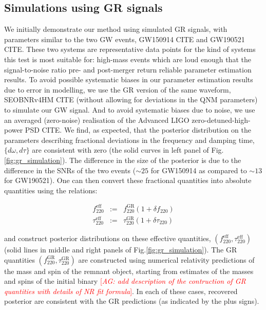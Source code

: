 \documentclass[twocolumn,prd,superscriptaddress,amsfonts,amssymb,amsmath,preprintnumbers]{revtex4-1}
\newcommand{\abhi}[1]{\textcolor{red}{[\textit{AG: #1}]}}
\begin{document}
\fi

\subsection{Simulations using GR signals}\label{ssec:gr_signal}

We initially demonstrate our method using simulated GR signals, with parameters similar to the two GW events, GW150914 CITE and GW190521 CITE. These two systems are representative data points for the kind of systems this test is most suitable for: high-mass events which are loud enough that the signal-to-noise ratio pre- and post-merger return reliable parameter estimation results. To avoid possible systematic biases in our parameter estimation results due to error in modelling, we use the GR version of the same waveform, SEOBNRv4HM CITE (without allowing for deviations in the QNM parameters) to simulate our GW signal. And to avoid systematic biases due to noise, we use an averaged (zero-noise) realisation of the Advanced LIGO zero-detuned-high-power PSD CITE. We find, as expected, that the posterior distribution on the parameters describing fractional deviations in the frequency and damping time, $\{d\omega,d\tau\}$ are consistent with zero (the solid curves in left panel of Fig.\ref{fig:gr_simulation}). The difference in the size of the posterior is due to the difference in the SNRs of the two events ($\sim 25$ for GW150914 as compared to $\sim 13$ for GW190521). One can then convert these fractional quantities into absolute quantities using the relations:

\begin{eqnarray}
f_{220}^{\text{eff}} &:=& f_{220}^{\text{GR}} (1 + \delta f_{220}) \\
\tau _{220}^{\text{eff}} &:=& \tau _{220}^{\text{GR}} (1 + \delta \tau_{220})
\end{eqnarray}

and construct posterior distributions on these effective quantities, $(f_{220}^{\text{eff}}, \tau _{220}^{\text{eff}})$ (solid lines in middle and right panels of Fig.\ref{fig:gr_simulation}). The GR quantities $(f_{220}^{\text{GR}}, \tau _{220}^{\text{GR}})$ are constructed using numerical relativity predictions of the mass and spin of the remnant object, starting from estimates of the masses and spins of the initial binary \abhi{add description of the contruction of GR quantities with details of NR fit formula}. In each of these cases, recovered posterior are consistent with the GR predictions (as indicated by the plus signs).
\end{document}
